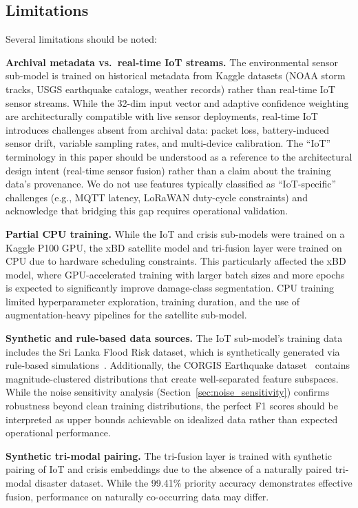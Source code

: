 \documentclass[journal]{IEEEtran}
\begin{document}
\subsection{Limitations}
\label{sec:limitations}

Several limitations should be noted:

\textbf{Archival metadata vs.\ real-time IoT streams.} The environmental sensor sub-model is trained on historical metadata from Kaggle datasets (NOAA storm tracks, USGS earthquake catalogs, weather records) rather than real-time IoT sensor streams. While the 32-dim input vector and adaptive confidence weighting are architecturally compatible with live sensor deployments, real-time IoT introduces challenges absent from archival data: packet loss, battery-induced sensor drift, variable sampling rates, and multi-device calibration. The ``IoT'' terminology in this paper should be understood as a reference to the architectural design intent (real-time sensor fusion) rather than a claim about the training data's provenance. We do not use features typically classified as ``IoT-specific'' challenges (e.g., MQTT latency, LoRaWAN duty-cycle constraints) and acknowledge that bridging this gap requires operational validation.

\textbf{Partial CPU training.} While the IoT and crisis sub-models were trained on a Kaggle P100 GPU, the xBD satellite model and tri-fusion layer were trained on CPU due to hardware scheduling constraints. This particularly affected the xBD model, where GPU-accelerated training with larger batch sizes and more epochs is expected to significantly improve damage-class segmentation. CPU training limited hyperparameter exploration, training duration, and the use of augmentation-heavy pipelines for the satellite sub-model.

\textbf{Synthetic and rule-based data sources.} The IoT sub-model's training data includes the Sri Lanka Flood Risk dataset, which is synthetically generated via rule-based simulations~\cite{kaggle_srilanka_flood}. Additionally, the CORGIS Earthquake dataset~\cite{corgis_eq} contains magnitude-clustered distributions that create well-separated feature subspaces. While the noise sensitivity analysis (Section~\ref{sec:noise_sensitivity}) confirms robustness beyond clean training distributions, the perfect F1 scores should be interpreted as upper bounds achievable on idealized data rather than expected operational performance.

\textbf{Synthetic tri-modal pairing.} The tri-fusion layer is trained with synthetic pairing of IoT and crisis embeddings due to the absence of a naturally paired tri-modal disaster dataset. While the 99.41\% priority accuracy demonstrates effective fusion, performance on naturally co-occurring data may differ.
\end{document}
